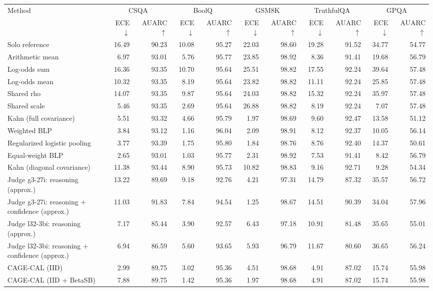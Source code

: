 \begin{tabular}{lrrrrrrrrrr}
\toprule
Method & \multicolumn{2}{c}{CSQA} & \multicolumn{2}{c}{BoolQ} & \multicolumn{2}{c}{GSM8K} & \multicolumn{2}{c}{TruthfulQA} & \multicolumn{2}{c}{GPQA} \\
 & ECE $\downarrow$ & AUARC $\uparrow$ & ECE $\downarrow$ & AUARC $\uparrow$ & ECE $\downarrow$ & AUARC $\uparrow$ & ECE $\downarrow$ & AUARC $\uparrow$ & ECE $\downarrow$ & AUARC $\uparrow$ \\
\midrule
Solo reference & 16.49 & 90.23 & 10.08 & 95.27 & 22.03 & 98.60 & 19.28 & 91.52 & 34.77 & 54.77 \\
Arithmetic mean & 6.97 & 93.01 & 5.76 & 95.77 & 23.85 & 98.92 & 8.36 & 91.41 & 19.68 & 56.79 \\
Log-odds sum & 16.36 & 93.35 & 10.70 & 95.64 & 25.51 & 98.82 & 17.55 & 92.24 & 39.64 & 57.48 \\
Log-odds mean & 10.32 & 93.35 & 8.19 & 95.64 & 23.82 & 98.82 & 11.11 & 92.24 & 25.85 & 57.48 \\
Shared rho & 14.07 & 93.35 & 9.87 & 95.64 & 24.03 & 98.82 & 15.32 & 92.24 & 35.97 & 57.48 \\
Shared scale & 5.46 & 93.35 & 2.69 & 95.64 & 26.88 & 98.82 & 8.19 & 92.24 & 7.07 & 57.48 \\
Kahn (full covariance) & 5.51 & 93.32 & 4.66 & 95.79 & 1.97 & 98.69 & 9.60 & 92.47 & 13.58 & 51.12 \\
Weighted BLP & 3.84 & 93.12 & 1.16 & 96.04 & 2.09 & 98.91 & 8.12 & 92.37 & 10.05 & 56.14 \\
Regularized logistic pooling & 3.77 & 93.39 & 1.75 & 95.80 & 1.84 & 98.76 & 8.76 & 92.40 & 14.37 & 50.61 \\
Equal-weight BLP & 2.65 & 93.01 & 1.03 & 95.77 & 2.31 & 98.92 & 7.53 & 91.41 & 8.42 & 56.79 \\
Kahn (diagonal covariance) & 11.38 & 93.44 & 8.90 & 95.73 & 10.82 & 98.83 & 9.16 & 92.71 & 9.28 & 54.34 \\
Judge g3-27i: reasoning (approx.) & 13.22 & 89.69 & 9.18 & 92.76 & 4.21 & 97.31 & 14.79 & 87.32 & 35.57 & 56.72 \\
Judge g3-27i: reasoning + confidence (approx.) & 11.03 & 91.83 & 7.84 & 94.54 & 1.25 & 98.67 & 14.51 & 90.39 & 34.04 & 57.96 \\
Judge l32-3bi: reasoning (approx.) & 7.17 & 85.44 & 3.90 & 92.57 & 6.43 & 97.18 & 10.91 & 81.48 & 35.65 & 55.01 \\
Judge l32-3bi: reasoning + confidence (approx.) & 6.94 & 86.59 & 5.60 & 93.65 & 5.93 & 96.79 & 11.67 & 80.60 & 36.65 & 56.24 \\
CAGE-CAL (IID) & 2.99 & 89.75 & 3.02 & 95.36 & 4.51 & 98.68 & 4.91 & 87.02 & 15.74 & 55.98 \\
CAGE-CAL (IID + BetaSB) & 7.88 & 89.75 & 1.42 & 95.36 & 1.97 & 98.68 & 4.91 & 87.02 & 15.74 & 55.98 \\
\bottomrule
\end{tabular}
